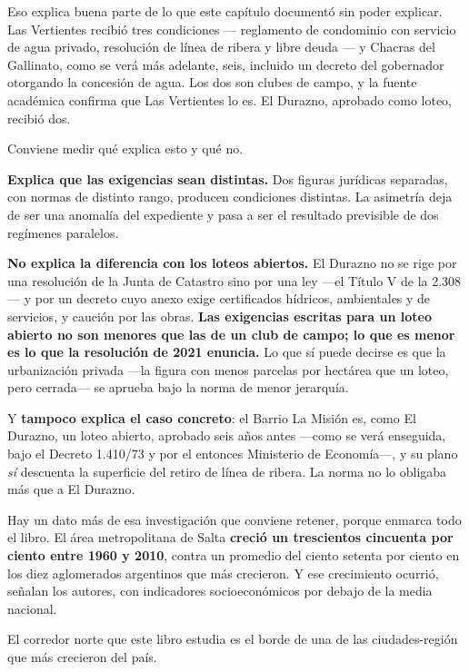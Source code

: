 Eso explica buena parte de lo que este capítulo documentó sin poder explicar. Las Vertientes
recibió tres condiciones --- reglamento de condominio con servicio de agua privado, resolución
de línea de ribera y libre deuda --- y Chacras del Gallinato, como se verá más adelante, seis, incluido un decreto del
gobernador otorgando la concesión de agua. Los dos son clubes de campo, y la fuente académica
confirma que Las Vertientes lo es. El Durazno, aprobado como loteo, recibió dos.

\begin{cautela}
Conviene medir qué explica esto y qué no.

\textbf{Explica que las exigencias sean distintas.} Dos figuras jurídicas separadas, con normas
de distinto rango, producen condiciones distintas. La asimetría deja de ser una anomalía del
expediente y pasa a ser el resultado previsible de dos regímenes paralelos.

\textbf{No explica la diferencia con los loteos abiertos.} El Durazno no se rige por una resolución de la Junta de Catastro sino por una ley ---el Título V de la 2.308--- y por un decreto cuyo anexo exige certificados hídricos, ambientales y de servicios, y caución por las obras. \textbf{Las exigencias escritas para un loteo abierto no son menores que las de un club de campo; lo que es menor es lo que la resolución de 2021 enuncia.} Lo que sí puede decirse es que la urbanización privada ---la figura con menos parcelas por hectárea que un loteo, pero cerrada--- se aprueba bajo la norma de menor jerarquía.

Y \textbf{tampoco explica el caso concreto}: el Barrio La Misión es, como El Durazno, un loteo abierto, aprobado seis años antes ---como se verá enseguida, bajo el Decreto 1.410/73 y por el entonces Ministerio de Economía---, y su plano \textit{sí} descuenta la superficie del retiro de línea de ribera. La norma no lo obligaba más que a El
Durazno.
\end{cautela}

Hay un dato más de esa investigación que conviene retener, porque enmarca todo el libro. El
área metropolitana de Salta \textbf{creció un trescientos cincuenta por ciento entre 1960 y
2010}, contra un promedio del ciento setenta por ciento en los diez aglomerados argentinos que
más crecieron. Y ese crecimiento ocurrió, señalan los autores, con indicadores
socioeconómicos por debajo de la media nacional.

El corredor norte que este libro estudia es el borde de una de las ciudades-región que más crecieron del
país.

